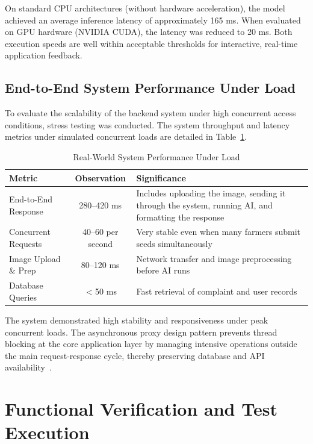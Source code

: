 On standard CPU architectures (without hardware acceleration), the model achieved an average inference latency of approximately 165 ms. When evaluated on GPU hardware (NVIDIA CUDA), the latency was reduced to 20 ms. Both execution speeds are well within acceptable thresholds for interactive, real-time application feedback.

\subsection{End-to-End System Performance Under Load}

To evaluate the scalability of the backend system under high concurrent access conditions, stress testing was conducted. The system throughput and latency metrics under simulated concurrent loads are detailed in Table~\ref{tab:backendperformance}.

\begin{table}[htbp]
  \centering
  \caption{Real-World System Performance Under Load}
  \label{tab:backendperformance}
  \small
  \renewcommand{\arraystretch}{1.1}
  \begin{tabularx}{\textwidth}{|p{4.5cm}|c|X|}
    \hline
    \textbf{Metric} & \textbf{Observation} & \textbf{Significance} \\
    \hline
    End-to-End Response & 280--420 ms & Includes uploading the image, sending it through the system, running AI, and formatting the response \\
    \hline
    Concurrent Requests & 40--60 per second & Very stable even when many farmers submit seeds simultaneously \\
    \hline
    Image Upload \& Prep & 80--120 ms & Network transfer and image preprocessing before AI runs \\
    \hline
    Database Queries & $<$50 ms & Fast retrieval of complaint and user records \\
    \hline
  \end{tabularx}
\end{table}

The system demonstrated high stability and responsiveness under peak concurrent loads. The asynchronous proxy design pattern prevents thread blocking at the core application layer by managing intensive operations outside the main request-response cycle, thereby preserving database and API availability~\cite{martin2018clean}.

\section{Functional Verification and Test Execution}

